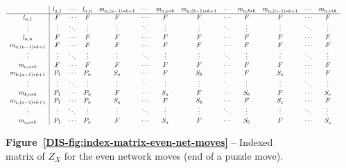 \begin{figure}[H]
	\centering
	\small
	\begin{adjustwidth}{\extralength}{\extralength}
		\setlength{\arraycolsep}{3pt}%
		\renewcommand{\arraystretch}{1.05}%
		\[
		\resizebox{1\linewidth}{!}{$
			\begin{array}{c|cccccccccccc}
				& l_{a,1} & \cdots & l_{a,n} & m_{a,(a-1)*k + 1} & \cdots & m_{a,a * k} & m_{a,(b-1)*k + 1} & \cdots & m_{a,b*k} & m_{a,(c-1)*k + 1} & \cdots & m_{a,c*k} \\ \hline
				l_{a,1} & F & \cdots & F & F & \cdots & F & F & \cdots & F & F & \cdots & F \\
				\vdots  & \vdots & \ddots & \vdots & \vdots & \ddots & \vdots & \vdots & \ddots & \vdots & \vdots & \ddots & \vdots \\
				l_{a,n} & F & \cdots & F & F & \cdots & F & F & \cdots & F & F & \cdots & F \\
				m_{a,(a-1)*k + 1} & F & \cdots & F & F & \cdots & F & F & \cdots & F & F & \cdots & F \\
				\vdots  & \vdots & \ddots & \vdots & \vdots & \ddots & \vdots & \vdots & \ddots & \vdots & \vdots & \ddots & \vdots \\
				m_{a,a*k} & F & \cdots & F & F & \cdots & F & F & \cdots & F & F & \cdots & F \\
				m_{b,(a-1)*k + 1} & P_{1} & \cdots & P_{n} & S_{a} & \cdots & F & S_{b} & \cdots & F & S_{c} & \cdots & F \\
				\vdots  & \vdots & \ddots & \vdots & \vdots & \ddots & \vdots & \vdots & \ddots & \vdots & \vdots & \ddots & \vdots \\
				m_{b,a*k} & P_{1} & \cdots & P_{n} & F & \cdots & S_{a} & F & \cdots & S_{b} & F & \cdots & S_{c} \\
				m_{c,(a-1)*k + 1} & P_{1} & \cdots & P_{n} & S_{a} & \cdots & F & S_{b} & \cdots & F & S_{c} & \cdots & F \\
				\vdots  & \vdots & \ddots & \vdots & \vdots & \ddots & \vdots & \vdots & \ddots & \vdots & \vdots & \ddots & \vdots \\
				m_{c,a*k} & P_{1} & \cdots & P_{n} & F & \cdots & S_{a} & F & \cdots & S_{b} & F & \cdots & S_{c}
			\end{array}
			$}
		\]
	\end{adjustwidth}
	\caption*{\textbf{Figure~\ref{DIS-fig:index-matrix-even-net-moves}} -- Indexed matrix of $Z_X$ for the even network moves (end of a puzzle move).}
\end{figure}
	
